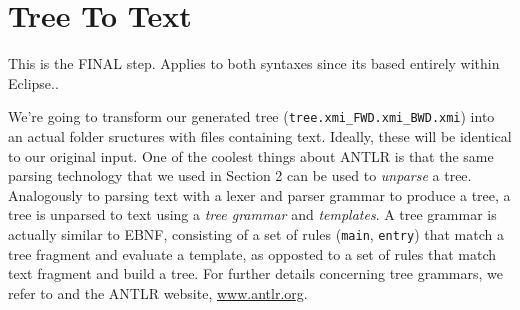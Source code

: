 \newpage
\hypertarget{}{}
\section{Tree To Text}
\genHeader

This is the FINAL step. Applies to both syntaxes since its based entirely within Eclipse..

We're going to transform our generated tree (\texttt{tree.xmi\_FWD.xmi\_BWD.xmi}) into an actual folder sructures with files containing text. Ideally, these
will be identical to our original input. One of the coolest things about ANTLR is that the same parsing technology that we used in Section 2 can be used to
\emph{unparse} a tree. Analogously to parsing text with a lexer and parser grammar to produce a tree, a tree is unparsed to text using a \emph{tree grammar} and
\emph{templates}. A tree grammar is actually similar to EBNF, consisting of a set of rules (\texttt{main}, \texttt{entry}) that match a tree fragment and evaluate a
template, as opposted to a set of rules that match text fragment and build a tree. For further details concerning tree grammars, we refer to \cite{ANTLR} and
the ANTLR website, \url{www.antlr.org}.

